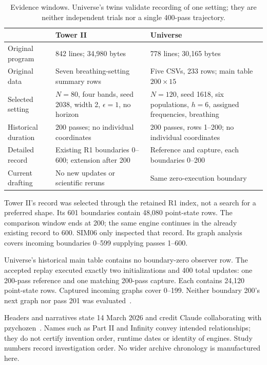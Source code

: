 \documentclass[11pt,a4paper]{article}
\begin{document}
\begin{table}[H]\centering\small
\begin{tabularx}{\textwidth}{p{28mm}X X}
\toprule & Tower II & Universe\\\midrule
Original program & 842 lines; 34,980 bytes & 778 lines; 30,165 bytes\\
Original data & Seven breathing-setting summary rows & Five CSVs, 233 rows; main table \(200\times15\)\\
Selected setting & \(N=80\), four bands, seed 2038, width 2, \(\epsilon=1\), no horizon & \(N=120\), seed 1618, six populations, \(h=6\), assigned frequencies, breathing\\
Historical duration & 200 passes; no individual coordinates & 200 passes, rows 1--200; no individual coordinates\\
Detailed record & Existing R1 boundaries 0--600; extension after 200 & Reference and capture, each boundaries 0--200\\
Current drafting & No new updates or scientific reruns & Same zero-execution boundary\\
\bottomrule\end{tabularx}
\caption{Evidence windows. Universe's twins validate recording of one setting; they are neither independent trials nor a single 400-pass trajectory.}
\end{table}

Tower II's record was selected through the retained R1 index, not a search for a preferred shape. Its 601 boundaries contain 48,080 point-state rows. The comparison window ends at 200; the same engine continues in the already existing record to 600. SIM06 only inspected that record. Its graph analysis covers incoming boundaries 0--599 supplying passes 1--600.

Universe's historical main table contains no boundary-zero observer row. The accepted replay executed exactly two initializations and 400 total updates: one 200-pass reference and one matching 200-pass capture. Each contains 24,120 point-state rows. Captured incoming graphs cover 0--199. Neither boundary 200's next graph nor pass 201 was evaluated~\citep{s7rprovenance,s7rreview}.

Headers and narratives state 14 March 2026 and credit Claude collaborating with pzychozen~\citep{towernote,universenote}. Names such as Part II and Infinity convey intended relationships; they do not certify invention order, runtime dates or identity of engines. Study numbers record investigation order. No wider archive chronology is manufactured here.
\end{document}
